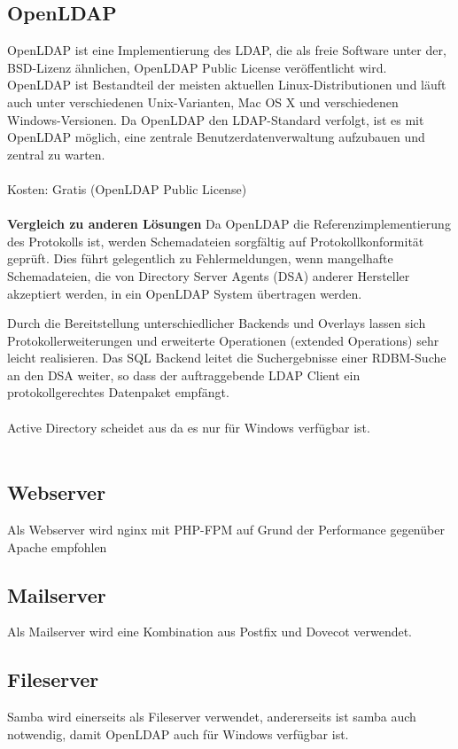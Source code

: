 \documentclass[main.tex]{subfiles}
\begin{document}
\subsection{OpenLDAP}
OpenLDAP ist eine Implementierung des LDAP, die als freie Software unter der, BSD-Lizenz ähnlichen, 
OpenLDAP Public License veröffentlicht wird. OpenLDAP ist Bestandteil der meisten aktuellen
Linux-Distributionen und läuft auch unter verschiedenen Unix-Varianten, Mac OS X und verschiedenen Windows-Versionen.
Da OpenLDAP den LDAP-Standard verfolgt, ist es mit OpenLDAP möglich,
eine zentrale Benutzerdatenverwaltung aufzubauen und zentral zu warten.
\\\\
Kosten: Gratis (OpenLDAP Public License)
\\\\
\textbf{Vergleich zu anderen Lösungen}
Da OpenLDAP die Referenzimplementierung des Protokolls ist, werden Schemadateien sorgfältig
auf Protokollkonformität geprüft. Dies führt gelegentlich zu Fehlermeldungen, wenn mangelhafte Schemadateien,
die von Directory Server Agents (DSA) anderer Hersteller akzeptiert werden, in ein OpenLDAP System übertragen werden.

Durch die Bereitstellung unterschiedlicher Backends und Overlays lassen sich Protokollerweiterungen und
erweiterte Operationen (extended Operations) sehr leicht realisieren. Das SQL Backend leitet die
Suchergebnisse einer RDBM-Suche an den DSA weiter, so dass der auftraggebende LDAP Client ein
protokollgerechtes Datenpaket empfängt.
 \\\\
 Active Directory scheidet aus da es nur für Windows verfügbar ist.
 \\\\
 
 \subsection{Webserver}
 Als Webserver wird nginx mit PHP-FPM auf Grund der Performance gegenüber Apache empfohlen
 
 \subsection{Mailserver}
 Als Mailserver wird eine Kombination aus Postfix und Dovecot verwendet.
 
 \subsection{Fileserver}
 Samba wird einerseits als Fileserver verwendet, andererseits ist samba auch notwendig, 	damit OpenLDAP auch für Windows verfügbar ist.
\end{document}
